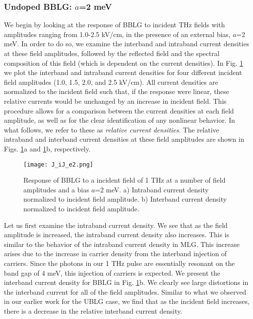\documentclass[twocolumn,secnumarabic,amssymb, nobibnotes, aps, prd, superscriptaddress]{revtex4-1}
\begin{document}
\subsubsection{Undoped BBLG: $a$=2 meV}
We begin by looking at the response of BBLG to incident THz fields with amplitudes ranging from 1.0-2.5 kV/cm, in the presence of an external bias, $a$=2 meV. In order to do so, we examine the interband and intraband current densities at these field amplitudes, followed by the reflected field and the spectral composition of this field (which is dependent on the current densities). In Fig. \ref{fig:5.6} we plot the interband and intraband current densities for four different incident field amplitudes (1.0, 1.5, 2.0, and 2.5 kV/cm). All current densities are normalized to the incident field such that, if the response were linear, these relative currents would be unchanged by an increase in incident field. This procedure allows for a comparison between the current densities at each field amplitude, as well as for the clear identification of any nonlinear behavior. In what follows, we refer to these as \textit{relative current densities}. The relative intraband and interband current densities at these field amplitudes are shown in Figs. \ref{fig:5.6}a and \ref{fig:5.6}b, respectively. 


\begin{figure}[h]
\centering
\texttt{[image: J\_iJ\_e2.png]}
\caption{Response of BBLG to a incident field of 1 THz at a number of field amplitudes and a bias $a$=2 meV. a) Intraband current density normalized to incident field amplitude. b) Interband current density normalized to incident field amplitude.}\label{fig:5.6}
\end{figure}

Let us first examine the intraband current density.  We see that as the field amplitude is increased, the intraband current density also increases. This is similar to the behavior of the intraband current density in MLG\cite{al2014high}. This increase arises due to the increase in carrier density from the interband injection of carriers. Since the photons in our 1 THz pulse are essentially resonant on the band gap of 4 meV, this injection of carriers is expected. We present the interband current density for BBLG in Fig. \ref{fig:5.6}b. We clearly see large distortions in the interband current for all of the field amplitudes. Similar to what we observed in our earlier work for the UBLG case\cite{mcgouran2016nonlinear}, we find that as the incident field increases, there is a decrease in the relative interband current density. 
\end{document}
